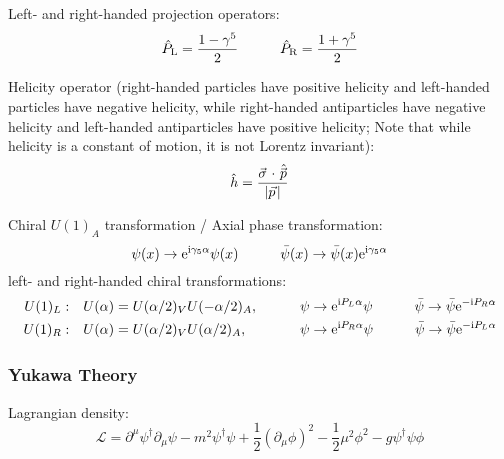 			\noindent
			Left- and right-handed projection operators:
			\begin{equation}
				\label{Eq:SpinorProjectionOperators}
				\hat{P}_{\mathrm{L}}=\frac{1-\gamma^{5}}{2} \hspace{30pt}
				\hat{P}_{\mathrm{R}}=\frac{1+\gamma^{5}}{2}
			\end{equation}

			\noindent
			Helicity operator (\ie right-handed particles have positive helicity and left-handed particles have negative helicity, while right-handed antiparticles have negative helicity and left-handed antiparticles have positive helicity; Note that while helicity is a constant of motion, it is not Lorentz invariant):
			\begin{equation}
				\hat{h} = \frac{\vec{\sigma}\cdot\hat{\vec{p}}}{\abs{\vec{p}}}
			\end{equation}

			\noindent
			Chiral $U(1)_A$ transformation / Axial phase transformation:
			\begin{equation}
				\psi(x) \to \mathrm{e}^{\mathrm{i} \gamma_5 \alpha} \psi(x)
				\hspace{30pt} \bar{\psi}(x) \to \bar{\psi}(x) \mathrm{e}^{\mathrm{i} \gamma_5 \alpha}
			\end{equation}
			left- and right-handed chiral transformations:
			\begin{align}
				U(1)_L:&\quad U(\alpha) = U(\alpha/2)_V U(-\alpha/2)_A,
				\hspace{30pt} \psi \to \mathrm{e}^{\mathrm{i} P_L \alpha} \psi
				\hspace{30pt} \bar{\psi} \to \bar{\psi} \mathrm{e}^{-\mathrm{i} P_R \alpha} \\
				U(1)_R:&\quad U(\alpha) = U(\alpha/2)_V U(\alpha/2)_A, \phantom{-}
				\hspace{30pt} \psi \to \mathrm{e}^{\mathrm{i} P_R \alpha} \psi
				\hspace{30pt} \bar{\psi} \to \bar{\psi} \mathrm{e}^{-\mathrm{i} P_L \alpha}
			\end{align}


		\subsubsection{Yukawa Theory}
			Lagrangian density:
			\begin{equation}
				\mathcal{L}=\partial^{\mu}\psi^{\dagger}\partial_{\mu}\psi-m^{2}\psi^{\dagger}\psi+\frac{1}{2}(\partial_{\mu}\phi)^{2}-\frac{1}{2}\mu^{2}\phi^{2}-g\psi^{\dagger}\psi\phi
			\end{equation}

